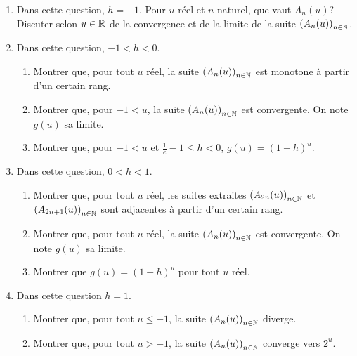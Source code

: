 \begin{enumerate}
  \item Dans cette question, $h=-1$. Pour $u$ réel et $n$ naturel, que vaut $A_n(u)$? Discuter selon $u\in\mathbb{R}$ de la convergence et de la limite de la suite $\left( A_n(u)\right)_{n\in \mathbb{N}}$. 

 \item Dans cette question, $-1< h < 0$.
\begin{enumerate}
 \item Montrer que, pour tout $u$ réel, la suite $\left( A_n(u)\right) _{n\in \mathbb{N}}$ est monotone à partir d'un certain rang.
 \item Montrer que, pour $-1 < u$, la suite $\left( A_n(u)\right)_{n\in \mathbb{N}}$ est convergente. On note $g(u)$ sa limite.
 \item Montrer que, pour $-1 < u$ et $\frac{1}{e}-1\leq h <0$,  $g(u) = (1+h)^u$.
\end{enumerate}

\item Dans cette question, $0 < h <1$.
\begin{enumerate}
 \item Montrer que, pour tout $u$ réel, les suites extraites $\left( A_{2n}(u)\right)_{n\in \mathbb{N}}$ et $\left( A_{2n+1}(u)\right)_{n\in \mathbb{N}}$ sont adjacentes à partir d'un certain rang.
 \item Montrer que, pour tout $u$ réel, la suite $\left( A_n(u)\right)_{n\in \mathbb{N}}$ est convergente. On note $g(u)$ sa limite.
 \item Montrer que $g(u) = (1+h)^u$ pour tout $u$ réel.
\end{enumerate}

\item Dans cette question $h=1$.
\begin{enumerate}
 \item Montrer que, pour tout $u\leq -1$, la suite $\left( A_n(u)\right)_{n\in \mathbb{N}}$ diverge.
 \item Montrer que, pour tout $u> -1$, la suite $\left( A_n(u)\right)_{n\in \mathbb{N}}$ converge vers $2^u$.
\end{enumerate}

\end{enumerate}

 